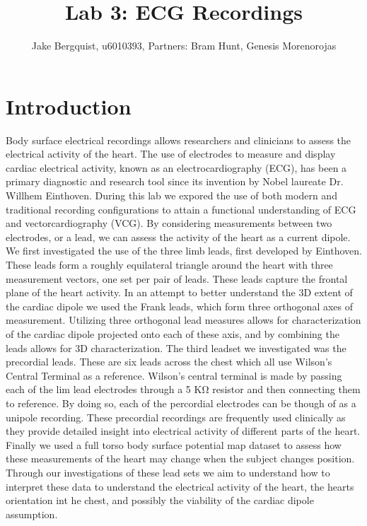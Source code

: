 \documentclass[12pt]{article}
\begin{document}
\title{Lab 3: ECG Recordings}
\author{Jake Bergquist, u6010393, Partners: Bram Hunt, Genesis Morenorojas }
\maketitle

\section{Introduction}
\par{}
Body surface electrical recordings allows researchers and clinicians to assess the electrical activity of the heart. The use of electrodes to measure and display cardiac electrical activity, known as an electrocardiography (ECG), has been a primary diagnostic and research tool since its invention by Nobel laureate Dr. Willhem Einthoven. During this lab we expored the use of both modern and traditional recording configurations to attain a functional understanding of ECG and vectorcardiography (VCG). By considering measurements between two electrodes, or a lead, we can assess the activity of the heart as a current dipole. We first investigated the use of the three limb leads, first developed by Einthoven. These leads form a roughly equilateral triangle around the heart with three measurement vectors, one set per pair of leads. These leads capture the frontal plane of the heart activity. In an attempt to better understand the 3D extent of the cardiac dipole we used the Frank leads, which form three orthogonal axes of measurement. Utilizing three orthogonal lead measures allows for characterization of the cardiac dipole projected onto each of these axis, and by combining the leads allows for 3D characterization. The third leadset we investigated was the precordial leads. These are six leads across the chest which all use Wilson's Central Terminal as a reference. Wilson's central terminal is made by passing each of the lim lead electrodes through a 5 K\si{\ohm} resistor and then connecting them to reference. By doing so, each of the percordial electrodes can be though of as a unipole recording. These precordial recordings are frequently used clinically as they provide detailed insight into electrical activity of different parts of the heart. Finally we used a full torso body surface potential map dataset to assess how these measurements of the heart may change when the subject changes position. Through our investigations of these lead sets we aim to understand how to interpret these data to understand the electrical activity of the heart, the hearts orientation int he chest, and possibly the viability of the cardiac dipole assumption.
\end{document}
